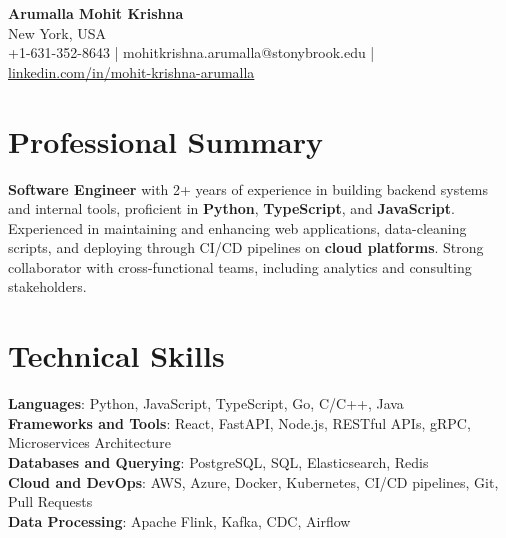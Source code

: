 \documentclass[letterpaper,11pt]{article}
\begin{document}
\begin{center}
  {\Large \textbf{Arumalla Mohit Krishna}} \\
  New York, USA \\
  +1-631-352-8643 \enspace | \enspace mohitkrishna.arumalla@stonybrook.edu \enspace | \enspace \href{https://www.linkedin.com/in/mohit-krishna-arumalla}{linkedin.com/in/mohit-krishna-arumalla}
\end{center}

\section{Professional Summary}
  \begin{itemize}[leftmargin=0.15in, label={}]
    \small{\item{
     \textbf{Software Engineer} with 2+ years of experience in building backend systems and internal tools, proficient in \textbf{Python}, \textbf{TypeScript}, and \textbf{JavaScript}. Experienced in maintaining and enhancing web applications, data-cleaning scripts, and deploying through CI/CD pipelines on \textbf{cloud platforms}. Strong collaborator with cross-functional teams, including analytics and consulting stakeholders.
    }}
  \end{itemize}
\vspace{-16pt}

\section{Technical Skills}
 \begin{itemize}[leftmargin=0.15in, label={}]
    \small{\item{
     \textbf{Languages}: Python, JavaScript, TypeScript, Go, C/C++, Java \\
     \textbf{Frameworks and Tools}: React, FastAPI, Node.js, RESTful APIs, gRPC, Microservices Architecture \\
     \textbf{Databases and Querying}: PostgreSQL, SQL, Elasticsearch, Redis \\
     \textbf{Cloud and DevOps}: AWS, Azure, Docker, Kubernetes, CI/CD pipelines, Git, Pull Requests \\
     \textbf{Data Processing}: Apache Flink, Kafka, CDC, Airflow \\
    }}
 \end{itemize}
\vspace{-16pt}
\end{document}
